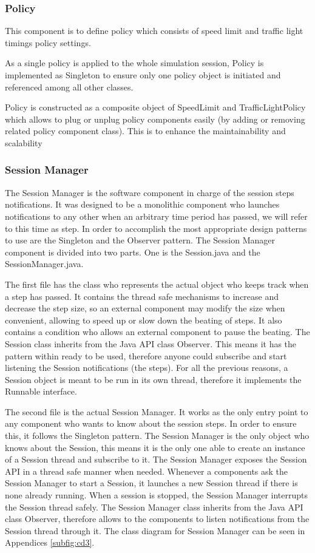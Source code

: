 \documentclass[11pt]{article}
\begin{document}
{\begin{itemize}
\subsubsection{Policy}        


This component is to define policy which consists of speed limit and traffic light timings policy settings.

As a single policy is applied to the whole simulation session, Policy is implemented as Singleton to ensure only one policy object is initiated and referenced among all other classes. 
 
Policy is constructed as a composite object of SpeedLimit and TrafficLightPolicy which allows to plug or unplug policy components easily (by adding or removing related policy component class). This is to enhance the maintainability and scalability

\subsubsection{Session Manager}
The Session Manager is the software component in charge of the session steps notifications. 
It was designed to be a monolithic component who launches notifications to any other when an arbitrary time period has passed, we will refer to this time as step. In order to accomplish the most appropriate design patterns to use are the Singleton and the Observer pattern.
The Session Manager component is divided into two parts. One is the Session.java and the SessionManager.java.

The first file has the class who represents the actual object who keeps track when a step has passed. It contains the thread safe mechanisms to increase and decrease the step size, so an external component may modify the size when convenient, allowing to speed up or slow down the beating of steps. It also contains a condition who allows an external component to pause the beating. The Session class inherits from the Java API class Observer. This means it has the pattern within ready to be used, therefore anyone could subscribe and start listening the Session notifications (the steps). For all the previous reasons, a Session object is meant to be run in its own thread, therefore it implements the Runnable interface.

The second file is the actual Session Manager. It works as the only entry point to any component who wants to know about the session steps. In order to ensure this, it follows the Singleton pattern. The Session Manager is the only object who knows about the Session, this means it is the only one able to create an instance of a Session thread and subscribe to it. The Session Manager exposes the Session API in a thread safe manner when needed. Whenever a components ask the Session Manager to start a Session, it launches a new Session thread if there is none already running. When a session is stopped, the Session Manager interrupts the Session thread safely. The Session Manager class inherits from the Java API class Observer, therefore allows to the components to listen notifications from the Session thread through it. The class diagram for Session Manager can be seen in Appendices \ref{subfig:cd3}.


\end{itemize}}
\end{document}
